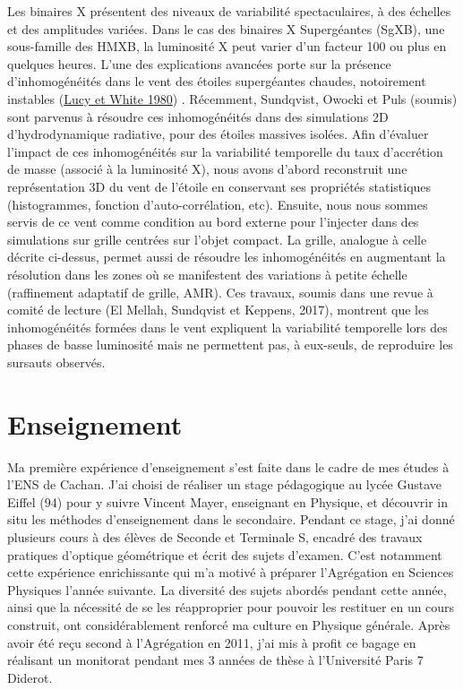 \documentclass[a4paper,12pt,onecolumn]{article}
\begin{document}
\indent Les binaires X présentent des niveaux de variabilité spectaculaires, à des échelles et des amplitudes variées. Dans le cas des binaires X Supergéantes (SgXB), une sous-famille des HMXB, la luminosité X peut varier d'un facteur 100 ou plus en quelques heures. L'une des explications avancées porte sur la présence d'inhomogénéités dans le vent des étoiles supergéantes chaudes, notoirement instables (\href{http://adsabs.harvard.edu/doi/10.1086/158342}{Lucy et White 1980}) . Récemment, Sundqvist, Owocki et Puls (soumis) sont parvenus à résoudre ces inhomogénéités dans des simulations 2D d'hydrodynamique radiative, pour des étoiles massives isolées. Afin d'évaluer l'impact de ces inhomogénéités sur la variabilité temporelle du taux d'accrétion de masse (associé à la luminosité X), nous avons d'abord reconstruit une représentation 3D du vent de l'étoile en conservant ses propriétés statistiques (histogrammes, fonction d'auto-corrélation, etc). Ensuite, nous nous sommes servis de ce vent comme condition au bord externe pour l'injecter dans des simulations sur grille centrées sur l'objet compact. La grille, analogue à celle décrite ci-dessus, permet aussi de résoudre les inhomogénéités en augmentant la résolution dans les zones où se manifestent des variations à petite échelle (raffinement adaptatif de grille, AMR). Ces travaux, soumis dans une revue à comité de lecture (El Mellah, Sundqvist et Keppens, 2017), montrent que les inhomogénéités formées dans le vent expliquent la variabilité temporelle lors des phases de basse luminosité mais ne permettent pas, à eux-seuls, de reproduire les sursauts observés.\\

\section*{Enseignement}

\indent \indent Ma première expérience d'enseignement s'est faite dans le cadre de mes études à l'ENS de Cachan. J'ai choisi de réaliser un stage pédagogique au lyc\'ee Gustave Eiffel (94) pour y suivre Vincent Mayer, enseignant en Physique, et découvrir in situ les méthodes d'enseignement dans le secondaire. Pendant ce stage, j'ai donné plusieurs cours à des élèves de Seconde et Terminale S, encadré des travaux pratiques d'optique géométrique et écrit des sujets d'examen. C'est notamment cette expérience enrichissante qui m'a motivé à préparer l'Agrégation en Sciences Physiques l'année suivante. La diversité des sujets abordés pendant cette année, ainsi que la nécessité de se les réapproprier pour pouvoir les restituer en un cours construit, ont considérablement renforcé ma culture en Physique générale. 
\indent Après avoir été re\c cu second à l'Agrégation en 2011, j'ai mis à profit ce bagage en réalisant un monitorat pendant mes 3 années de thèse à l'Université Paris 7 Diderot.
\end{document}
